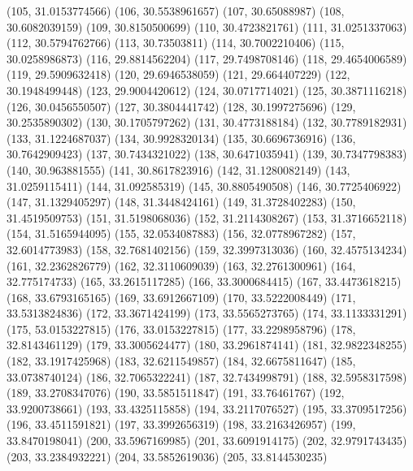 {					(105, 31.0153774566)
					(106, 30.5538961657)
					(107, 30.65088987)
					(108, 30.6082039159)
					(109, 30.8150500699)
					(110, 30.4723821761)
					(111, 31.0251337063)
					(112, 30.5794762766)
					(113, 30.73503811)
					(114, 30.7002210406)
					(115, 30.0258986873)
					(116, 29.8814562204)
					(117, 29.7498708146)
					(118, 29.4654006589)
					(119, 29.5909632418)
					(120, 29.6946538059)
					(121, 29.664407229)
					(122, 30.1948499448)
					(123, 29.9004420612)
					(124, 30.0717714021)
					(125, 30.3871116218)
					(126, 30.0456550507)
					(127, 30.3804441742)
					(128, 30.1997275696)
					(129, 30.2535890302)
					(130, 30.1705797262)
					(131, 30.4773188184)
					(132, 30.7789182931)
					(133, 31.1224687037)
					(134, 30.9928320134)
					(135, 30.6696736916)
					(136, 30.7642909423)
					(137, 30.7434321022)
					(138, 30.6471035941)
					(139, 30.7347798383)
					(140, 30.963881555)
					(141, 30.8617823916)
					(142, 31.1280082149)
					(143, 31.0259115411)
					(144, 31.092585319)
					(145, 30.8805490508)
					(146, 30.7725406922)
					(147, 31.1329405297)
					(148, 31.3448424161)
					(149, 31.3728402283)
					(150, 31.4519509753)
					(151, 31.5198068036)
					(152, 31.2114308267)
					(153, 31.3716652118)
					(154, 31.5165944095)
					(155, 32.0534087883)
					(156, 32.0778967282)
					(157, 32.6014773983)
					(158, 32.7681402156)
					(159, 32.3997313036)
					(160, 32.4575134234)
					(161, 32.2362826779)
					(162, 32.3110609039)
					(163, 32.2761300961)
					(164, 32.775174733)
					(165, 33.2615117285)
					(166, 33.3000684415)
					(167, 33.4473618215)
					(168, 33.6793165165)
					(169, 33.6912667109)
					(170, 33.5222008449)
					(171, 33.5313824836)
					(172, 33.3671424199)
					(173, 33.5565273765)
					(174, 33.1133331291)
					(175, 53.0153227815)
					(176, 33.0153227815)
					(177, 33.2298958796)
					(178, 32.8143461129)
					(179, 33.3005624477)
					(180, 33.2961874141)
					(181, 32.9822348255)
					(182, 33.1917425968)
					(183, 32.6211549857)
					(184, 32.6675811647)
					(185, 33.0738740124)
					(186, 32.7065322241)
					(187, 32.7434998791)
					(188, 32.5958317598)
					(189, 33.2708347076)
					(190, 33.5851511847)
					(191, 33.76461767)
					(192, 33.9200738661)
					(193, 33.4325115858)
					(194, 33.2117076527)
					(195, 33.3709517256)
					(196, 33.4511591821)
					(197, 33.3992656319)
					(198, 33.2163426957)
					(199, 33.8470198041)
					(200, 33.5967169985)
					(201, 33.6091914175)
					(202, 32.9791743435)
					(203, 33.2384932221)
					(204, 33.5852619036)
					(205, 33.8144530235)
}
